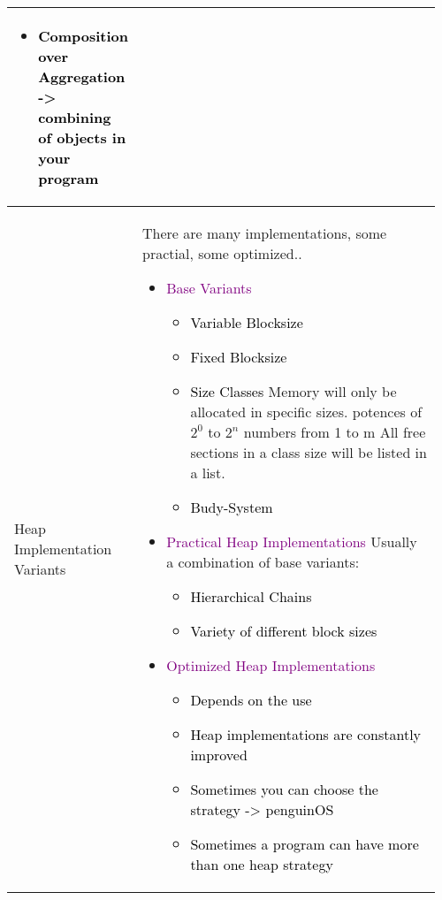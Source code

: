 \documentclass[main.tex,fontsize=8pt,paper=a4,paper=portrait,DIV=calc,]{scrartcl}
\begin{document}
\begin{table}[ht!]
\begin{tabular}{|m{0.2\linewidth}|m{0.755\linewidth}|}
\begin{itemize}
\item \textcolor{black}{Composition over Aggregation -> combining of objects in your program}
\vspace{-3mm}
\end{itemize} 
\\
\hline
Heap Implementation Variants & 
There are many implementations, some practial, some optimized..\newline
\begin{itemize}
\item \textcolor{purple}{Base Variants}\newline
  \begin{itemize}
  \item \textcolor{black}{Variable Blocksize}
  \item \textcolor{black}{Fixed Blocksize}
  \item \textcolor{black}{Size Classes}
    Memory will only be allocated in specific sizes.\newline
    potences of \(2^0\) to \(2^n\)\newline
    numbers from 1 to m\newline
    All free sections in a class size will be listed in a list.
  \item \textcolor{black}{Budy-System}
  \end{itemize} 
\item \textcolor{purple}{Practical Heap Implementations}\newline
  Usually a combination of base variants:\newline
  \begin{itemize}
  \item \textcolor{black}{Hierarchical Chains}
  \item \textcolor{black}{Variety of different block sizes}
  \end{itemize} 
\item \textcolor{purple}{Optimized Heap Implementations}\newline
  \begin{itemize}
  \item \textcolor{black}{Depends on the use}
  \item \textcolor{black}{Heap implementations are constantly improved}
  \item \textcolor{black}{Sometimes you can choose the strategy -> penguinOS}
  \item \textcolor{black}{Sometimes a program can have more than one heap strategy}
  \end{itemize} 

\end{itemize}
\end{tabular}
\end{table}
\end{document}
